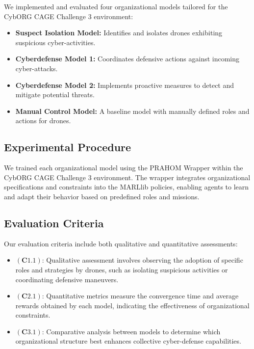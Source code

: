 \documentclass[conference]{IEEEtran}
\begin{document}
We implemented and evaluated four organizational models tailored for the CybORG CAGE Challenge 3 environment:

\begin{itemize}
    \item \textbf{Suspect Isolation Model:} Identifies and isolates drones exhibiting suspicious cyber-activities.
    \item \textbf{Cyberdefense Model 1:} Coordinates defensive actions against incoming cyber-attacks.
    \item \textbf{Cyberdefense Model 2:} Implements proactive measures to detect and mitigate potential threats.
    \item \textbf{Manual Control Model:} A baseline model with manually defined roles and actions for drones.
\end{itemize}

\subsection{Experimental Procedure}

We trained each organizational model using the PRAHOM Wrapper within the CybORG CAGE Challenge 3 environment. The wrapper integrates organizational specifications and constraints into the MARLlib policies, enabling agents to learn and adapt their behavior based on predefined roles and missions.

\subsection{Evaluation Criteria}

Our evaluation criteria include both qualitative and quantitative assessments:

\begin{itemize}
    \item $(\mathbf{C1.1})$: Qualitative assessment involves observing the adoption of specific roles and strategies by drones, such as isolating suspicious activities or coordinating defensive maneuvers.
    \item $(\mathbf{C2.1})$: Quantitative metrics measure the convergence time and average rewards obtained by each model, indicating the effectiveness of organizational constraints.
    \item $(\mathbf{C3.1})$: Comparative analysis between models to determine which organizational structure best enhances collective cyber-defense capabilities.
\end{itemize}
\end{document}
